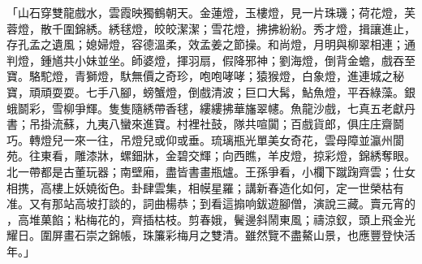 「山石穿雙龍戲水，雲霞映獨鶴朝天。金蓮燈，玉樓燈，見一片珠璣；荷花燈，芙蓉燈，散千圍錦綉。綉毬燈，皎皎潔潔；雪花燈，拂拂紛紛。秀才燈，揖讓進止，存孔孟之遺風；媳婦燈，容德溫柔，效孟姜之節操。和尚燈，月明與柳翠相連；通判燈，鍾馗共小妹並坐。師婆燈，揮羽扇，假降邪神；劉海燈，倒背金蟾，戲吞至寶。駱駝燈，青獅燈，馱無價之奇珍，咆咆哮哮；猿猴燈，白象燈，進連城之秘寶，頑頑耍耍。七手八腳，螃蟹燈，倒戲清波；巨口大髯，鮎魚燈，平吞綠藻。銀蛾鬬彩，雪柳爭輝。隻隻隨綉帶香毬，縷縷拂華旛翠幰。魚龍沙戲，七真五老獻丹書；吊掛流蘇，九夷八蠻來進寶。村裡社鼓，隊共喧闐；百戲貨郎，俱庄庄齋鬬巧。轉燈兒一來一往，吊燈兒或仰或垂。琉璃瓶光單美女奇花，雲母障並瀛州閬苑。往東看，雕漆牀，螺鈿牀，金碧交輝；向西瞧，羊皮燈，掠彩燈，錦綉奪眼。北一帶都是古董玩器；南壁廂，盡皆書畫瓶爐。王孫爭看，小欄下蹴踘齊雲；仕女相携，高樓上妖嬈衒色。卦肆雲集，相幙星羅；講新春造化如何，定一世榮枯有准。又有那站高坡打談的，詞曲楊恭；到看這搧响鈸遊腳僧，演說三藏。賣元宵的 ，高堆菓餡；粘梅花的，齊插枯枝。剪春娥，鬢邊斜鬧東風；禱涼釵，頭上飛金光耀日。圍屏畫石崇之錦帳，珠簾彩梅月之雙清。雖然覽不盡鰲山景，也應豐登快活年。」

